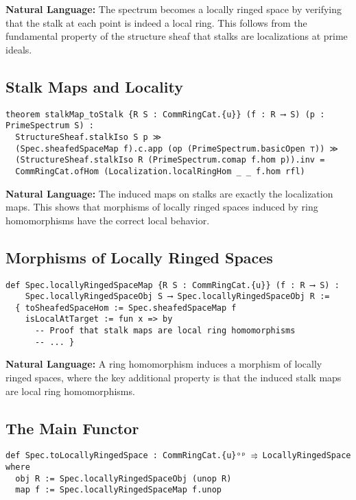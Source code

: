 \documentclass{article}
\theoremstyle{definition}
\begin{document}
\textbf{Natural Language:} The spectrum becomes a locally ringed space by verifying that the stalk at each point is indeed a local ring. This follows from the fundamental property of the structure sheaf that stalks are localizations at prime ideals.

\subsection{Stalk Maps and Locality}

\begin{lstlisting}
theorem stalkMap_toStalk {R S : CommRingCat.{u}} (f : R ⟶ S) (p : PrimeSpectrum S) :
  StructureSheaf.stalkIso S p ≫
  (Spec.sheafedSpaceMap f).c.app (op (PrimeSpectrum.basicOpen ⊤)) ≫
  (StructureSheaf.stalkIso R (PrimeSpectrum.comap f.hom p)).inv =
  CommRingCat.ofHom (Localization.localRingHom _ _ f.hom rfl)
\end{lstlisting}

\textbf{Natural Language:} The induced maps on stalks are exactly the localization maps. This shows that morphisms of locally ringed spaces induced by ring homomorphisms have the correct local behavior.

\subsection{Morphisms of Locally Ringed Spaces}

\begin{lstlisting}
def Spec.locallyRingedSpaceMap {R S : CommRingCat.{u}} (f : R ⟶ S) :
    Spec.locallyRingedSpaceObj S ⟶ Spec.locallyRingedSpaceObj R :=
  { toSheafedSpaceHom := Spec.sheafedSpaceMap f
    isLocalAtTarget := fun x => by
      -- Proof that stalk maps are local ring homomorphisms
      -- ... }
\end{lstlisting}

\textbf{Natural Language:} A ring homomorphism induces a morphism of locally ringed spaces, where the key additional property is that the induced stalk maps are local ring homomorphisms.

\subsection{The Main Functor}

\begin{lstlisting}
def Spec.toLocallyRingedSpace : CommRingCat.{u}ᵒᵖ ⥤ LocallyRingedSpace where
  obj R := Spec.locallyRingedSpaceObj (unop R)
  map f := Spec.locallyRingedSpaceMap f.unop
\end{lstlisting}
\end{document}
